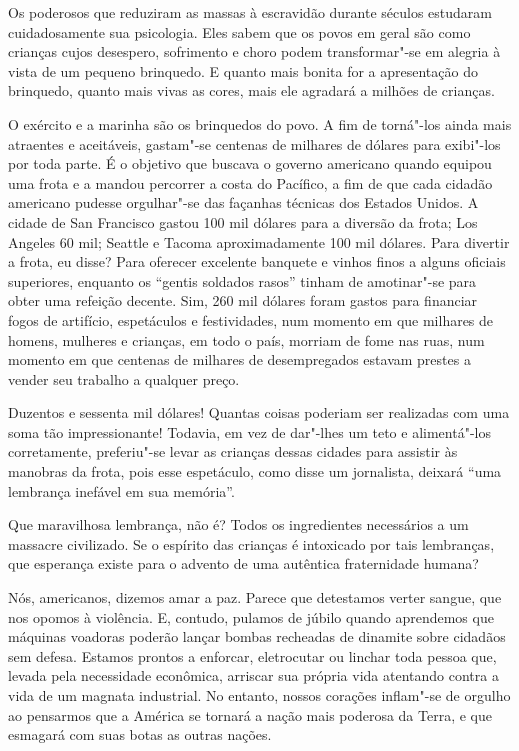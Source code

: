 Os poderosos que reduziram as massas à escravidão durante séculos
estudaram cuidadosamente sua psicologia. Eles sabem que os povos em
geral são como crianças cujos desespero, sofrimento e choro podem
transformar"-se em alegria à vista de um pequeno brinquedo. E quanto
mais bonita for a apresentação do brinquedo, quanto mais vivas as
cores, mais ele agradará a milhões de crianças.

O exército e a marinha são os brinquedos do povo. A fim de torná"-los
ainda mais atraentes e aceitáveis, gastam"-se centenas de milhares de
dólares para exibi"-los por toda parte. É o objetivo que buscava o
governo americano quando equipou uma frota e a mandou percorrer
a costa do Pacífico, a fim de que cada cidadão americano pudesse
orgulhar"-se das façanhas técnicas dos Estados Unidos. A cidade de San
Francisco gastou 100 mil dólares para a diversão da frota; Los Angeles
60 mil; Seattle e Tacoma aproximadamente 100 mil dólares. Para
divertir a frota, eu disse? Para oferecer excelente banquete e vinhos
finos a alguns oficiais superiores, enquanto os “gentis soldados rasos”
tinham de amotinar"-se para obter uma refeição decente. Sim, 
260 mil dólares foram gastos para financiar fogos de artifício,
espetáculos e festividades, num momento em que milhares de homens,
mulheres e crianças, em todo o país, morriam de fome nas ruas, num
momento em que centenas de milhares de desempregados estavam prestes a
vender seu trabalho a qualquer preço.

Duzentos e sessenta mil dólares! Quantas coisas poderiam ser realizadas
com uma soma tão impressionante! Todavia, em vez de dar"-lhes um teto
e alimentá"-los corretamente, preferiu"-se levar as crianças dessas
cidades para assistir às manobras da frota, pois esse espetáculo, como
disse um jornalista, deixará “uma lembrança inefável em sua memória”.

Que maravilhosa lembrança, não é? Todos os ingredientes necessários a um
massacre civilizado. Se o espírito das crianças é intoxicado por tais
lembranças, que esperança existe para o advento de uma autêntica
fraternidade humana?

Nós, americanos, dizemos amar a paz. Parece que detestamos verter
sangue, que nos opomos à violência. E, contudo, pulamos de júbilo
quando aprendemos que máquinas voadoras poderão lançar bombas recheadas
de dinamite sobre cidadãos sem defesa. Estamos prontos a enforcar,
eletrocutar ou linchar toda pessoa que, levada pela necessidade
econômica, arriscar sua própria vida atentando contra a vida de um
magnata industrial. No entanto, nossos corações inflam"-se de orgulho
ao pensarmos que a América se tornará a nação mais poderosa da
Terra, e que esmagará com suas botas as outras nações.

